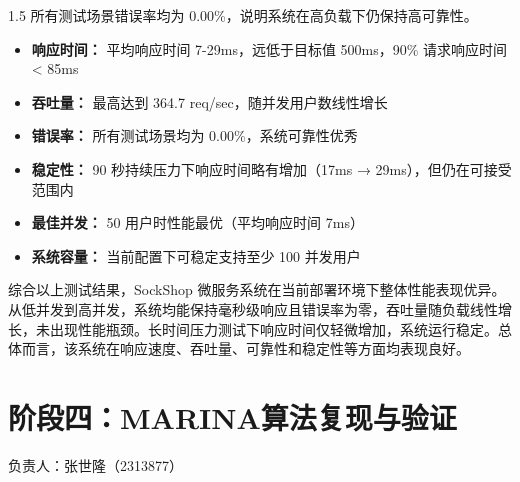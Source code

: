 \documentclass[a4paper,12pt]{report}
\begin{document}
\begin{spacing}{1.5}
所有测试场景错误率均为 0.00\%，说明系统在高负载下仍保持高可靠性。

\begin{itemize}
    \item \textbf{响应时间：} 平均响应时间 7-29ms，远低于目标值 500ms，90\% 请求响应时间 < 85ms
    \item \textbf{吞吐量：} 最高达到 364.7 req/sec，随并发用户数线性增长
    \item \textbf{错误率：} 所有测试场景均为 0.00\%，系统可靠性优秀
    \item \textbf{稳定性：} 90 秒持续压力下响应时间略有增加（17ms → 29ms），但仍在可接受范围内
    \item \textbf{最佳并发：} 50 用户时性能最优（平均响应时间 7ms）
    \item \textbf{系统容量：} 当前配置下可稳定支持至少 100 并发用户
\end{itemize}

综合以上测试结果，SockShop 微服务系统在当前部署环境下整体性能表现优异。从低并发到高并发，系统均能保持毫秒级响应且错误率为零，吞吐量随负载线性增长，未出现性能瓶颈。长时间压力测试下响应时间仅轻微增加，系统运行稳定。总体而言，该系统在响应速度、吞吐量、可靠性和稳定性等方面均表现良好。

\end{spacing}

\chapter*{阶段四：MARINA算法复现与验证}
\vspace{-0.5em}
\begin{flushright}
{\kaishu{} 负责人：张世隆（2313877）}
\end{flushright}
\end{document}
